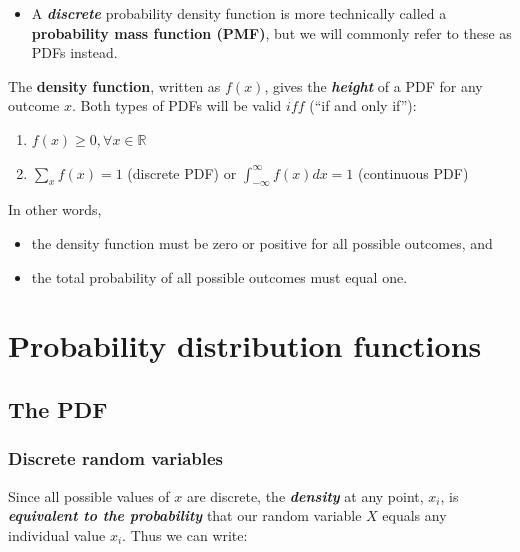\documentclass[
]{article}
\providecommand{\tightlist}{%
  \setlength{\itemsep}{0pt}\setlength{\parskip}{0pt}}
\begin{document}
\begin{itemize}
\tightlist
\item
  A \textbf{\emph{discrete}} probability density function is more
  technically called a \textbf{probability mass function (PMF)}, but we
  will commonly refer to these as PDFs instead.
\end{itemize}

The \textbf{density function}, written as \(f(x)\), gives the
\textbf{\emph{height}} of a PDF for any outcome \(x\). Both types of
PDFs will be valid \(iff\) (``if and only if''):

\begin{enumerate}
\def\labelenumi{\arabic{enumi}.}
\tightlist
\item
  \(f(x) \ge 0, \forall x \in \mathbb{R}\)
\item
  \(\sum_x f(x) = 1\) (discrete PDF) or
  \(\int_{-\infty}^{\infty} f(x) dx = 1\) (continuous PDF)
\end{enumerate}

In other words,

\begin{itemize}
\tightlist
\item
  the density function must be zero or positive for all possible
  outcomes, and
\item
  the total probability of all possible outcomes must equal one.
\end{itemize}

\hypertarget{probability-distribution-functions}{%
\section{Probability distribution
functions}\label{probability-distribution-functions}}

\hypertarget{the-pdf}{%
\subsection{The PDF}\label{the-pdf}}

\hypertarget{discrete-random-variables}{%
\subsubsection{Discrete random
variables}\label{discrete-random-variables}}

Since all possible values of \(x\) are discrete, the
\textbf{\emph{density}} at any point, \(x_i\), is
\textbf{\emph{equivalent to the probability}} that our random variable
\(X\) equals any individual value \(x_i\). Thus we can write:
\end{document}
